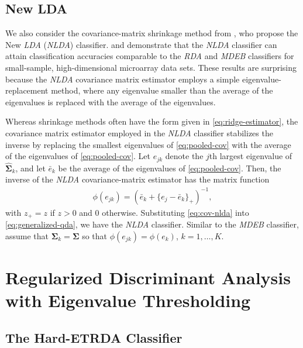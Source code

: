 \documentclass[11pt]{article}
\begin{document}
\subsection{New LDA}

We also consider the covariance-matrix shrinkage method from \cite{Thomaz:2006ef}, who propose the New \emph{LDA} (\emph{NLDA}) classifier. \cite*{Xu:2009fl} and \cite{Ramey:2011ji} demonstrate that the \emph{NLDA} classifier can attain classification accuracies comparable to the \emph{RDA} and \emph{MDEB} classifiers for small-sample, high-dimensional microarray data sets. These results are surprising because the \emph{NLDA} covariance matrix estimator employs a simple eigenvalue-replacement method, where any eigenvalue smaller than the average of the eigenvalues is replaced with the average of the eigenvalues.

Whereas shrinkage methods often have the form given in \eqref{eq:ridge-estimator}, the covariance matrix estimator employed in the \emph{NLDA} classifier stabilizes the inverse by replacing the smallest eigenvalues of \eqref{eq:pooled-cov} with the average of the eigenvalues of \eqref{eq:pooled-cov}. Let $e_{jk}$ denote the $j$th largest eigenvalue of $\widehat{\bm \Sigma}_k$, and let $\bar{e}_k$ be the average of the eigenvalues of \eqref{eq:pooled-cov}. Then, the inverse of the \emph{NLDA} covariance-matrix estimator has the matrix function
\begin{align}
	\phi(e_{jk}) = (\bar{e}_k + \{e_j - \bar{e}_k\}_+)^{-1},\label{eq:cov-nlda}
\end{align}
with $z_+ = z$ if $z > 0$ and 0 otherwise. Substituting \eqref{eq:cov-nlda} into \eqref{eq:generalized-qda}, we have the \emph{NLDA} classifier. Similar to the \emph{MDEB} classifier, \cite{Thomaz:2006ef} assume that $\bm \Sigma_k = \bm \Sigma$ so that $\phi(e_{jk}) = \phi(e_k)$, $k = 1, \ldots, K$. 

\section{Regularized Discriminant Analysis with Eigenvalue Thresholding}

\subsection{The Hard-ETRDA Classifier}
\end{document}
